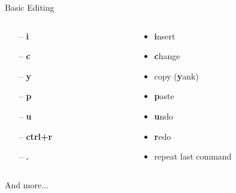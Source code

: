 \documentclass{beamer}
\begin{document}
\begin{frame}{Basic Editing}
    \begin{columns}
        \begin{column}{0.2\textwidth}
            \begin{itemize}
                \item[--] \textbf{i}
                \item[--] \textbf{c}
                \item[--] \textbf{y}
                \item[--] \textbf{p}
                \item[--] \textbf{u}
                \item[--] \textbf{ctrl+r}
                \item[--] \textbf{.}
            \end{itemize}
        \end{column}
        \begin{column}{0.8\textwidth}
            \begin{itemize}
                \item \textbf{i}nsert
                \item \textbf{c}hange
                \item copy (\textbf{y}ank)
                \item \textbf{p}aste
                \item \textbf{u}ndo
                \item \textbf{r}edo
                \item repeat last command
            \end{itemize}
        \end{column}
    \end{columns}
    \begin{center}
        \large And more...
    \end{center}
\end{frame}
\end{document}
